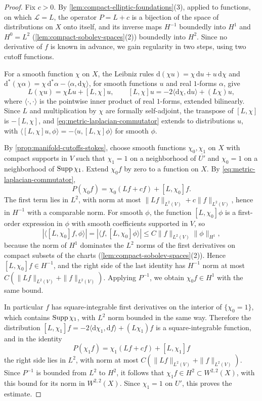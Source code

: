 \begin{proof}
Fix $c>0$. By \cref{lem:compact-elliptic-foundations}(3), applied to functions, on which $\mathcal L=L$, the operator $P=L+c$ is a bijection of the space of distributions on $X$ onto itself, and its inverse maps $H^{-1}$ boundedly into $H^1$ and $H^0=L^2$ (\cref{lem:compact-sobolev-spaces}(2)) boundedly into $H^2$. Since no derivative of $f$ is known in advance, we gain regularity in two steps, using two cutoff functions.

For a smooth function $\chi$ on $X$, the Leibniz rules $\mathrm d(\chi u)=\chi\,\mathrm du+u\,\mathrm d\chi$ and $\mathrm d^*(\chi\alpha)=\chi\,\mathrm d^*\alpha-\langle\alpha,\mathrm d\chi\rangle$, for smooth functions $u$ and real $1$-forms $\alpha$, give
\begin{equation}\label{eq:metric-laplacian-commutator}
 L(\chi u)=\chi Lu+[L,\chi]u,\qquad [L,\chi]u=-2\langle\mathrm d\chi,\mathrm du\rangle+(L\chi)u,
\end{equation}
where $\langle\cdot,\cdot\rangle$ is the pointwise inner product of real $1$-forms, extended bilinearly. Since $L$ and multiplication by $\chi$ are formally self-adjoint, the transpose of $[L,\chi]$ is $-[L,\chi]$, and \eqref{eq:metric-laplacian-commutator} extends to distributions $u$, with $\langle[L,\chi]u,\phi\rangle=-\langle u,[L,\chi]\phi\rangle$ for smooth $\phi$.

By \cref{prop:manifold-cutoffs-stokes}, choose smooth functions $\chi_0,\chi_1$ on $X$ with compact supports in $V$ such that $\chi_1=1$ on a neighborhood of $\overline{U'}$ and $\chi_0=1$ on a neighborhood of $\operatorname{Supp}\chi_1$. Extend $\chi_0f$ by zero to a function on $X$. By \eqref{eq:metric-laplacian-commutator},
\[
 P(\chi_0f)=\chi_0(Lf+cf)+[L,\chi_0]f.
\]
The first term lies in $L^2$, with norm at most $\|Lf\|_{L^2(V)}+c\|f\|_{L^2(V)}$, hence in $H^{-1}$ with a comparable norm. For smooth $\phi$, the function $[L,\chi_0]\phi$ is a first-order expression in $\phi$ with smooth coefficients supported in $V$, so
\[
 |\langle[L,\chi_0]f,\phi\rangle|=|\langle f,[L,\chi_0]\phi\rangle|\leq C\|f\|_{L^2(V)}\|\phi\|_{H^1},
\]
because the norm of $H^1$ dominates the $L^2$ norms of the first derivatives on compact subsets of the charts (\cref{lem:compact-sobolev-spaces}(2)). Hence $[L,\chi_0]f\in H^{-1}$, and the right side of the last identity has $H^{-1}$ norm at most $C(\|Lf\|_{L^2(V)}+\|f\|_{L^2(V)})$. Applying $P^{-1}$, we obtain $\chi_0f\in H^1$ with the same bound.

In particular $f$ has square-integrable first derivatives on the interior of $\{\chi_0=1\}$, which contains $\operatorname{Supp}\chi_1$, with $L^2$ norm bounded in the same way. Therefore the distribution $[L,\chi_1]f=-2\langle\mathrm d\chi_1,\mathrm df\rangle+(L\chi_1)f$ is a square-integrable function, and in the identity
\[
 P(\chi_1f)=\chi_1(Lf+cf)+[L,\chi_1]f
\]
the right side lies in $L^2$, with norm at most $C(\|Lf\|_{L^2(V)}+\|f\|_{L^2(V)})$. Since $P^{-1}$ is bounded from $L^2$ to $H^2$, it follows that $\chi_1f\in H^2\subset W^{2,2}(X)$, with this bound for its norm in $W^{2,2}(X)$. Since $\chi_1=1$ on $U'$, this proves the estimate.


\end{proof}
